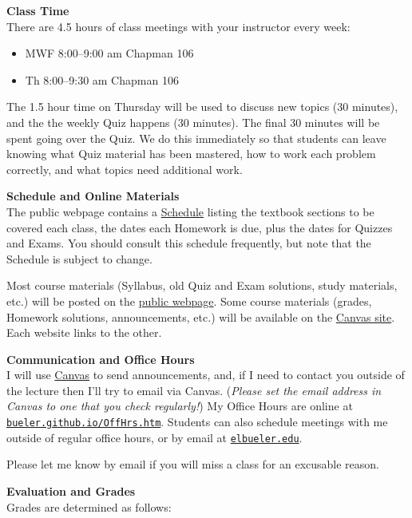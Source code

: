 \documentclass[12pt]{article}
\renewcommand{\emph}[1]{\textsf{\textbf{#1}}}
\newcommand{\localhead}[1]{\par\smallskip\textbf{#1} \smallskip\nobreak\\}%
\def\heading#1{\localhead{\large\emph{#1}}}
\begin{document}
\heading{Class Time}
There are 4.5 hours of class meetings with your instructor every week:
\begin{itemize}
\item MWF 8:00--9:00 am  Chapman 106
\item Th 8:00--9:30 am  Chapman 106
\end{itemize}

The 1.5 hour time on Thursday will be used to discuss new topics (30 minutes), and the the weekly Quiz happens (30 minutes).  The final 30 minutes will be spent going over the Quiz.  We do this immediately so that students can leave knowing what Quiz material has been mastered, how to work each problem correctly, and what topics need additional work.


\heading{Schedule and Online Materials}
The public webpage contains a \href{https://bueler.github.io/calc3/assets/general/schedule.pdf}{Schedule} listing the textbook sections to be covered each class, the dates each Homework is due, plus the dates for Quizzes and Exams.  You should consult this schedule frequently, but note that the Schedule is subject to change.

Most course materials (Syllabus, old Quiz and Exam solutions, study materials, etc.) will be posted on the \href{https://bueler.github.io/calc3/}{public webpage}.  Some course materials (grades, Homework solutions, announcements, etc.) will be available on the \href{https://canvas.alaska.edu/courses/13188}{Canvas site}.  Each website links to the other.


\heading{Communication and Office Hours}
I will use \href{https://canvas.alaska.edu/courses/13188}{Canvas} to send announcements, and, if I need to contact you outside of the lecture then I'll try to email via Canvas.  (\textsl{Please set the email address in Canvas to one that you check regularly!})  My Office Hours are online at \href{http://bueler.github.io/OffHrs.htm}{\texttt{bueler.github.io/OffHrs.htm}}.  Students can also schedule meetings with me outside of regular office hours, or by email at \href{mailto:elbueler@alaska.edu}{\texttt{elbueler\@@alaska.edu}}.

Please let me know by email if you will miss a class for an excusable reason.



\heading{Evaluation and Grades}
Grades are determined as follows:
 
\end{document}
